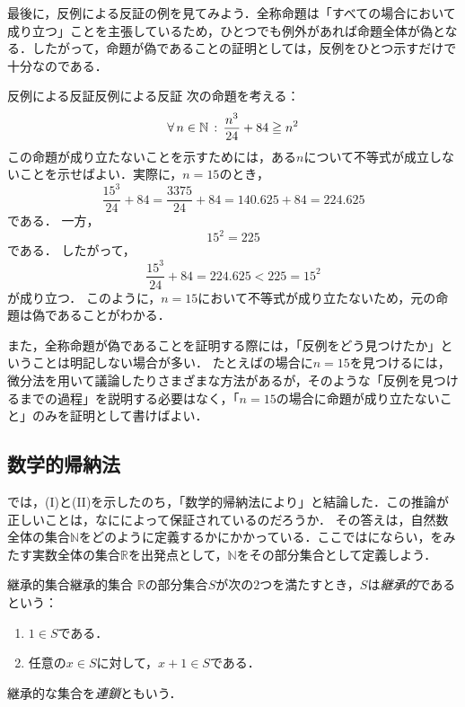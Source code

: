 最後に，反例による反証の例を見てみよう．全称命題は「すべての場合において成り立つ」ことを主張しているため，ひとつでも例外があれば命題全体が偽となる．したがって，命題が偽であることの証明としては，反例をひとつ示すだけで十分なのである．

\begin{example}{反例による反証}{反例による反証}
  次の命題を考える：
  \[
    \lall{n \in \mathbb{N}} \lst \frac{n^3}{24} + 84 \geqq n^2
  \]
  この命題が成り立たないことを示すためには，ある$n$について不等式が成立しないことを示せばよい．実際に，$n = 15$のとき，
  \[
    \frac{15^3}{24} + 84 = \frac{3375}{24} + 84 = 140.625 + 84 = 224.625
  \]
  である．
  一方，
  \[
    15^2 = 225
  \]
  である．
  したがって，
  \[
    \frac{15^3}{24} + 84 = 224.625 < 225 = 15^2
  \]
  が成り立つ．
  このように，$n = 15$において不等式が成り立たないため，元の命題は偽であることがわかる．
\end{example}

また，全称命題が偽であることを証明する際には，「反例をどう見つけたか」ということは明記しない場合が多い．
たとえばの場合に$n=15$を見つけるには，微分法を用いて議論したりさまざまな方法があるが，そのような「反例を見つけるまでの過程」を説明する必要はなく，「$n=15$の場合に命題が成り立たないこと」のみを証明として書けばよい．

\subsection{数学的帰納法}

では，(I)と(II)を示したのち，「数学的帰納法により」と結論した．この推論が正しいことは，なにによって保証されているのだろうか．
その答えは，自然数全体の集合$\mathbb{N}$をどのように定義するかにかかっている．ここでは\cite{sugiura1}にならい，をみたす実数全体の集合$\mathbb{R}$を出発点として，$\mathbb{N}$をその部分集合として定義しよう．

\begin{definition}{継承的集合}{継承的集合}
  $\mathbb{R}$の部分集合$S$が次の$2$つを満たすとき，$S$は\emph{継承的}であるという：
  \begin{enumerate}[label=(\roman*),leftmargin=3.2em]
    \item $1 \in S$である．
    \item 任意の$x \in S$に対して，$x + 1 \in S$である．
  \end{enumerate}
  継承的な集合を\emph{連鎖}ともいう\cite{akasetsuya}．
\end{definition}

